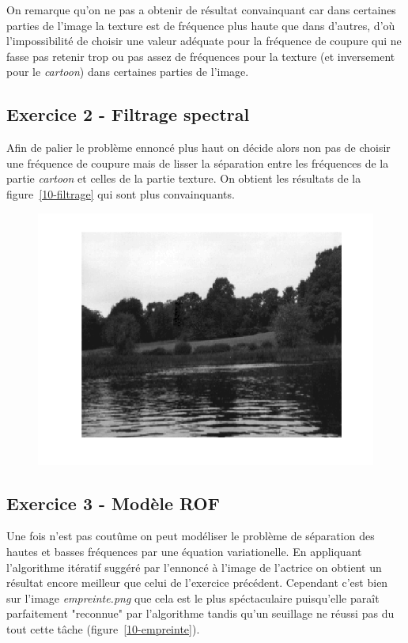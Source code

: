 \documentclass{article}
\begin{document}
On remarque qu'on ne pas a obtenir de résultat convainquant car dans certaines parties de l'image la texture est de fréquence plus haute que dans d'autres, d'où l'impossibilité de choisir une valeur adéquate pour la fréquence de coupure qui ne fasse pas retenir trop ou pas assez de fréquences pour la texture (et inversement pour le \emph{cartoon}) dans certaines parties de l'image.

\subsection{Exercice 2 - Filtrage spectral}
Afin de palier le problème ennoncé plus haut on décide alors non pas de choisir une fréquence de coupure mais de lisser la séparation entre les fréquences de la partie \emph{cartoon} et celles de la partie texture. On obtient les résultats de la figure~\ref{10-filtrage} qui sont plus convainquants.

\begin{figure}[!ht]
\includegraphics[width=\textwidth]{images/1/1-1-autumn_b.png}
\end{figure}

\subsection{Exercice 3 - Modèle ROF}
Une fois n'est pas coutûme on peut modéliser le problème de séparation des hautes et basses fréquences par une équation variationelle. En appliquant l'algorithme itératif suggéré par l'ennoncé à l'image de l'actrice on obtient un résultat encore meilleur que celui de l'exercice précédent. Cependant c'est bien sur l'image \emph{empreinte.png} que cela est le plus spéctaculaire puisqu'elle paraît parfaitement "reconnue" par l'algorithme tandis qu'un seuillage ne réussi pas du tout cette tâche (figure~\ref{10-empreinte}).
\end{document}
